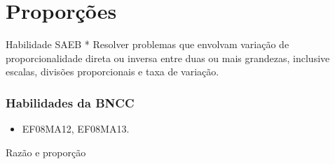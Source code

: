 
















\chapter{Proporções}

Habilidade SAEB * Resolver problemas que envolvam variação de
proporcionalidade direta ou inversa entre duas ou mais grandezas,
inclusive escalas, divisões proporcionais e taxa de variação.

\subsection{Habilidades da BNCC}

\begin{itemize}
\item EF08MA12, EF08MA13.
\end{itemize}

Razão e proporção

